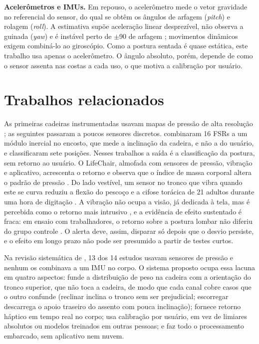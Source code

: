 \textbf{Acelerômetros e IMUs.} Em repouso, o acelerômetro mede o vetor
gravidade no referencial do sensor, do qual se obtêm os ângulos de arfagem
(\emph{pitch}) e rolagem (\emph{roll}). A estimativa supõe aceleração linear
desprezível, não observa a guinada (\emph{yaw}) e é instável perto de
$\pm$90\degree{} de arfagem \cite{pedley2013}; movimentos dinâmicos exigem
combiná-lo ao giroscópio. Como a postura sentada é quase estática, este
trabalho usa apenas o acelerômetro. O ângulo absoluto, porém, depende de como
o sensor assenta nas costas a cada uso, o que motiva a calibração por usuário.

\section{Trabalhos relacionados}
\label{sec:rev-relacionados}

As primeiras cadeiras instrumentadas usavam mapas de pressão de alta
resolução \cite{tan2001}; as seguintes passaram a poucos sensores discretos.
 combinaram 16 FSRs a um módulo inercial no encosto, que
mede a inclinação da cadeira, e não a do usuário, e classificaram sete
posições. Nesses trabalhos a saída é a classificação da postura, sem retorno ao
usuário. O LifeChair, almofada com sensores de pressão, vibração e aplicativo,
acrescenta o retorno e observa que o índice de massa corporal altera o padrão
de pressão \cite{bourahmoune2019}. Do lado vestível, um sensor no tronco que
vibra quando este se curva reduziu a flexão do pescoço e a cifose torácica de
21 adultos durante uma hora de digitação \cite{kuo2021}. A vibração não ocupa
a visão, já dedicada à tela, mas é percebida como o retorno mais intrusivo
\cite{haller2011}, e a evidência de efeito sustentado é fraca: em ensaio com
trabalhadores, o retorno sobre a postura lombar não diferiu do grupo controle
\cite{ribeiro2014}. O alerta deve, assim, disparar só depois que o desvio
persiste, e o efeito em longo prazo não pode ser presumido a partir de testes
curtos.

Na revisão sistemática de , 13 dos 14
estudos usavam sensores de pressão e nenhum os combinava a um IMU no corpo.
O sistema proposto ocupa essa lacuna em quatro aspectos: funde a
distribuição de peso na cadeira com a orientação do tronco superior, que não
toca a cadeira, de modo que cada canal cobre casos que o outro confunde
(reclinar inclina o tronco sem ser prejudicial; escorregar descarrega o apoio
traseiro do assento com pouca inclinação); fornece retorno háptico em
tempo real no corpo; usa calibração por usuário, em vez de limiares
absolutos ou modelos treinados em outras pessoas; e faz todo o
processamento embarcado, sem aplicativo nem nuvem.
